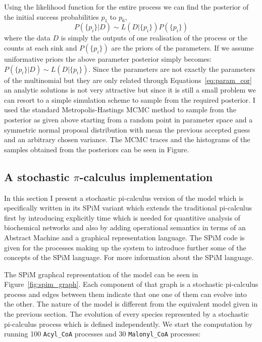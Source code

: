 Using the likelihood function for the entire process we can find the
posterior of the initial success probabilities $p_1$ to $p_6$,
\begin{equation*}
P(\{p_i\} | D) \sim L(D | \{p_i\}) P(\{p_i\})
\end{equation*}
where the data $D$ is simply the outputs of one realisation of the
process or the counts at each sink and $P(\{p_i\})$ are the priors of
the parameters. If we assume uniformative priors the above parameter
posterior simply becomes: $P(\{p_i\} | D) \sim L(D | \{p_i\})$. Since
the parameters are not exactly the parameters of the multinomial but
they are only related through Equations~\ref{eq:param_cor} an analytic
solutions is not very attractive but since it is still a small problem
we can resort to a simple simulation scheme to sample from the required
posterior. I used the standard Metropolis-Hastings MCMC method to
sample from the posterior as given above starting from a random point
in parameter space and a symmetric normal proposal distribution with
mean the previous accepted guess and an arbitrary chosen variance. The
MCMC traces and the histograms of the samples obtained from the
posteriors can be seen in Figure.


\subsection{A stochastic $\pi$-calculus implementation}
In this section I present a stochastic pi-calculus version of the
model which is specifically written in its SPiM variant which extends
the traditional pi-calculus first by introducing explicitly time which
is needed for quantitive analysis of biochemical networks and also by
adding operational semantics in terms of an Abstract Machine and a
graphical representation language. The SPiM code is given for the
processes making up the system to introduce further some of the
concepts of the SPiM language. For more information about the SPiM
language.

The SPiM graphcal representation of the model can be seen in
Figure~\ref{fig:spim_graph}. Each component of that graph is a
stochastic pi-calculus process and edges between them indicate that
one one of them can evolve into the other. The nature of the model is
different from the equivalent model given in the previous section. The
evolution of every species represented by a stochastic pi-calculus
process which is defined independently. We start the computation by running 100
\texttt{Acyl\_CoA} processes and 30 \texttt{Malonyl\_CoA} processes:

